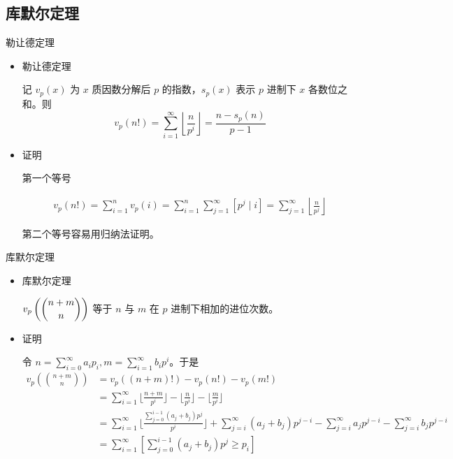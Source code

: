 \documentclass [hyperref={bookmarksdepth=4}, aspectratio=169] {beamer}
\theoremstyle {fy}
\begin{document}
\subsection{库默尔定理}

\begin{frame}{勒让德定理}
\begin{itemize}
    \item 勒让德定理

  记 $v_p(x)$ 为 $x$ 质因数分解后 $p$ 的指数，$s_p(x)$ 表示 $p$ 进制下 $x$ 各数位之和。则
  $$
  v_p(n!)=\sum_{i=1}^{\infty}\left\lfloor \frac{n}{p^i}\right\rfloor=\frac{n-s_p(n)}{p-1}
  $$

    \item 证明

  第一个等号

  $$
  \begin{aligned}
  v_p(n!)=\sum_{i=1}^nv_p(i)=\sum_{i=1}^n\sum_{j=1}^{\infty}[p^j\mid i]=\sum_{j=1}^{\infty}\left\lfloor\frac{n}{p^j}\right\rfloor
  \end{aligned}
  $$

  第二个等号容易用归纳法证明。
\end{itemize}
\end{frame}

\begin{frame}{库默尔定理}
\begin{itemize}
    \item 库默尔定理

  $v_p\left(\dbinom{n+m}{n}\right)$ 等于 $n$ 与 $m$ 在 $p$ 进制下相加的进位次数。

    \item 证明

  令 $n=\sum\limits_{i=0}^{\infty} a_ip_i,m=\sum\limits_{i=1}^{\infty}b_ip^i$。于是
  $$
  \begin{aligned}
  v_p\left(\binom{n+m}{n} \right)&=v_p((n+m)!)-v_p(n!)-v_p(m!)\\
  &=\sum_{i=1}^{\infty}\lfloor\frac{n+m}{p^i}\rfloor-\lfloor\frac{n}{p^i}\rfloor-\lfloor\frac{m}{p^i}\rfloor\\
  &=\sum_{i=1}^{\infty}\lfloor\frac{\sum_{j=0}^{i-1}(a_j+b_j)p^j}{p^i} \rfloor+\sum_{j=i}^{\infty}(a_j+b_j)p^{j-i}-\sum_{j=i}^{\infty}a_jp^{j-i}-\sum_{j=i}^{\infty}b_jp^{j-i}\\
  &=\sum_{i=1}^{\infty}[\sum_{j=0}^{i-1}(a_j+b_j)p^j\ge p_i]
  \end{aligned}
  $$
\end{itemize}
\end{frame}
\end{document}
